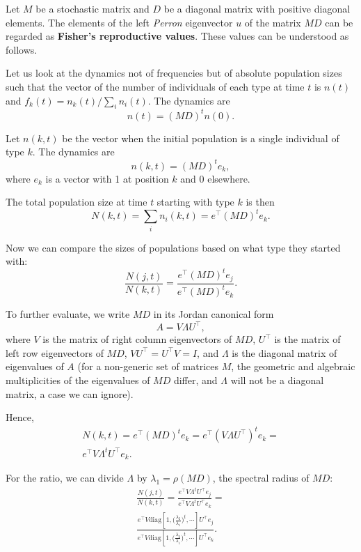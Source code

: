 \documentclass[9pt, a4paper, twocolumn]{extarticle}   	%
\newcommand*{\tr}{^\intercal}
\newcommand{\matrx}[1]{{\left[ \stackrel{}{#1}\right]}}
\newcommand{\diag}[1]{\mbox{diag}\matrx{#1}}
\begin{document}
Let $M$ be a stochastic matrix and $D$ be a diagonal matrix with positive diagonal elements. 
The elements of the left \emph{Perron} eigenvector $u$ of the matrix $MD$ can be regarded as \textbf{Fisher's reproductive values}.
These values can be understood as follows.

Let us look at the dynamics not of frequencies but of absolute population sizes such that the vector of the number of individuals of each type at time $t$ is $n(t)$ and $f_k(t) = n_k(t) / \sum_i{n_i(t)}$.
The dynamics are
\begin{equation}
n(t) = (MD)^t n(0).
\end{equation}

Let $n(k, t)$ be the vector when the initial population is a single individual of type $k$.
The dynamics are
\begin{equation}
n(k,t) = (MD)^t e_k,
\end{equation}
where $e_k$ is a vector with 1 at position $k$ and 0 elsewhere.

The total population size at time $t$ starting with type $k$ is then
\begin{equation}
N(k,t) = \sum_i{n_i(k,t)} = e\tr (MD)^t e_k.
\end{equation}

Now we can compare the sizes of populations based on what type they started
with:
\begin{equation}
\frac{N(j,t)}{N(k,t)} = \frac{e\tr (MD)^t e_j}{e\tr (MD)^t e_k}.
\end{equation}

To further evaluate, we write $MD$ in its Jordan canonical form 
\begin{equation}
A = V \Lambda U\tr,
\end{equation}
where $V$ is the matrix of right column eigenvectors of $MD$,
$U\tr$ is the matrix of left row eigenvectors of $MD$,
$V U\tr = U\tr V = I$, 
and $\Lambda$ is the diagonal matrix of eigenvalues of $A$ 
(for a non-generic set of matrices $M$, the geometric and algebraic multiplicities of the eigenvalues of $MD$ differ, and $\Lambda$ will not be a diagonal matrix, a case we can ignore).

Hence,
\begin{multline}
N(k, t) = 
e\tr (MD)^t e_k =
e\tr  (V \Lambda U\tr)^t e_k = \\
e\tr V \Lambda^t U\tr e_k.
\end{multline}

For the ratio, we can divide $\Lambda$ by $\lambda_1 = \rho(MD)$,
the spectral radius of $MD$:
\begin{multline}
\frac{N(j,t)}{N(k,t)} =
\frac{ e\tr V \Lambda^t U\tr e_j}{ e\tr V \Lambda^t U\tr e_k} = \\
\frac{ e\tr V \diag{1, \Big(\frac{\lambda_2}{\lambda_1}\Big)^t, \cdots} U\tr e_j} { e\tr V \diag{1,\Big(\frac{\lambda_2}{\lambda_1}\Big)^t, \cdots} U\tr e_k}.
\end{multline}
\end{document}
